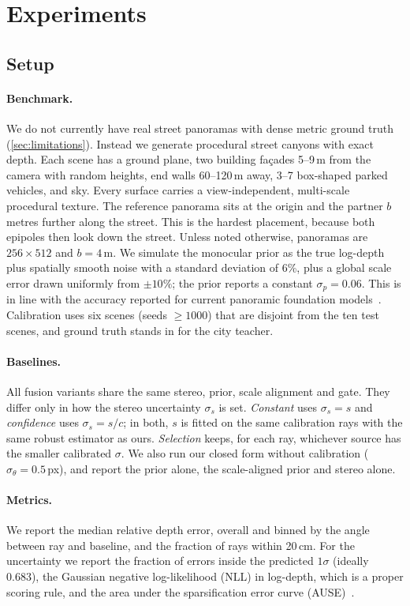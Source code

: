 \section{Experiments}
\label{sec:experiments}

\subsection{Setup}

\paragraph{Benchmark.}
We do not currently have real street panoramas with dense metric ground truth
(\cref{sec:limitations}). Instead we generate procedural street canyons with exact depth. Each scene
has a ground plane, two building fa\c{c}ades 5--9\,m from the camera with random heights, end walls
60--120\,m away, 3--7 box-shaped parked vehicles, and sky. Every surface carries a view-independent,
multi-scale procedural texture. The reference panorama sits at the origin and the partner $b$ metres
further along the street. This is the hardest placement, because both epipoles then look down the
street. Unless noted otherwise, panoramas are $256\times512$ and $b=4$\,m. We simulate the monocular
prior as the true log-depth plus spatially smooth noise with a standard deviation of 6\%, plus a global
scale error drawn uniformly from $\pm10\%$; the prior reports a constant $\sigma_p=0.06$. This is in
line with the accuracy reported for current panoramic foundation models~\cite{lin2026dap}. Calibration
uses six scenes (seeds $\geq1000$) that are disjoint from the ten test scenes, and ground truth stands
in for the city teacher.

\paragraph{Baselines.}
All fusion variants share the same stereo, prior, scale alignment and gate. They differ only in how the
stereo uncertainty $\sigma_s$ is set. \emph{Constant} uses $\sigma_s=s$ and \emph{confidence} uses
$\sigma_s=s/c$; in both, $s$ is fitted on the same calibration rays with the same robust estimator as
ours. \emph{Selection} keeps, for each ray, whichever source has the smaller calibrated $\sigma$. We
also run our closed form without calibration ($\sigma_\theta=0.5$\,px), and report the prior alone,
the scale-aligned prior and stereo alone.

\paragraph{Metrics.}
We report the median relative depth error, overall and binned by the angle between ray and baseline,
and the fraction of rays within 20\,cm. For the uncertainty we report the fraction of errors inside the
predicted $1\sigma$ (ideally 0.683), the Gaussian negative log-likelihood (NLL) in log-depth, which is a
proper scoring rule, and the area under the sparsification error curve
(AUSE)~\cite{ilg2018uncertainty}.


